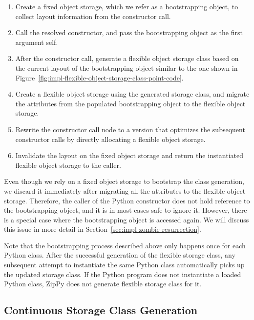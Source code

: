 \begin{enumerate}

\item Create a fixed object storage, which we refer as a bootstrapping object, to collect layout information from the constructor call.

\item Call the resolved constructor, and pass the bootstrapping object as the first argument \textsf{self}.

\item After the constructor call, generate a flexible object storage class based on the current layout of the bootstrapping object similar to the one shown in Figure~\ref{fig:impl-flexible-object-storage-class-point-code}.

\item Create a flexible object storage using the generated storage class, and migrate the attributes from the populated bootstrapping object to the flexible object storage.

\item Rewrite the constructor call node to a version that optimizes the subsequent constructor calls by directly allocating a flexible object storage.

\item Invalidate the layout on the fixed object storage and return the instantiated flexible object storage to the caller.

\end{enumerate}

Even though we rely on a fixed object storage to bootstrap the class generation, we discard it immediately after migrating all the attributes to the flexible object storage.
Therefore, the caller of the Python constructor does not hold reference to the bootstrapping object, and it is in most cases safe to ignore it.
However, there is a special case where the bootstrapping object is accessed again.
We will discuss this issue in more detail in Section~\ref{sec:impl-zombie-resurrection}.

Note that the bootstrapping process described above only happens once for each Python class.
After the successful generation of the flexible storage class, any subsequent attempt to instantiate the same Python class automatically picks up the updated storage class.
If the Python program does not instantiate a loaded Python class, ZipPy does not generate flexible storage class for it.

\subsection{Continuous Storage Class Generation}
\label{sec:impl-flexible-storage-layout-evolution}

